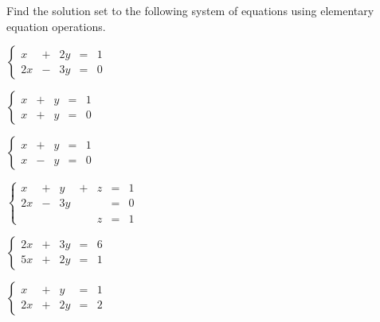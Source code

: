 \begin{exercise}
Find the solution set to the following system of equations using elementary equation operations.\\
\begin{inparaenum}[a)]
\item $\left\{ \begin{matrix} x&+&2y &=&1 \\ 2x&-&3y &= &0 \end{matrix}\right. $ \hfill
\item $\left\{ \begin{matrix} x&+&y &=&1 \\ x&+&y &= &0 \end{matrix}\right. $ \hfill
\item $\left\{ \begin{matrix} x&+&y &=&1 \\ x&-&y &= &0 \end{matrix}\right. $ \hfill {} \\
\item $\left\{ \begin{matrix} x&+&y&+&z &=&1 \\ 2x&-&3y& & &= &0 \\ & & & & z&=&1\end{matrix}\right. $ \hfill
\item $\left\{ \begin{matrix} 2x&+&3y &=&6 \\ 5x&+&2y &= &1 \end{matrix}\right. $ \hfill
\item $\left\{ \begin{matrix} x&+&y &=&1 \\ 2x&+&2y &= &2 \end{matrix}\right. $ \hfill {} \\
\end{inparaenum}
\end{exercise}
